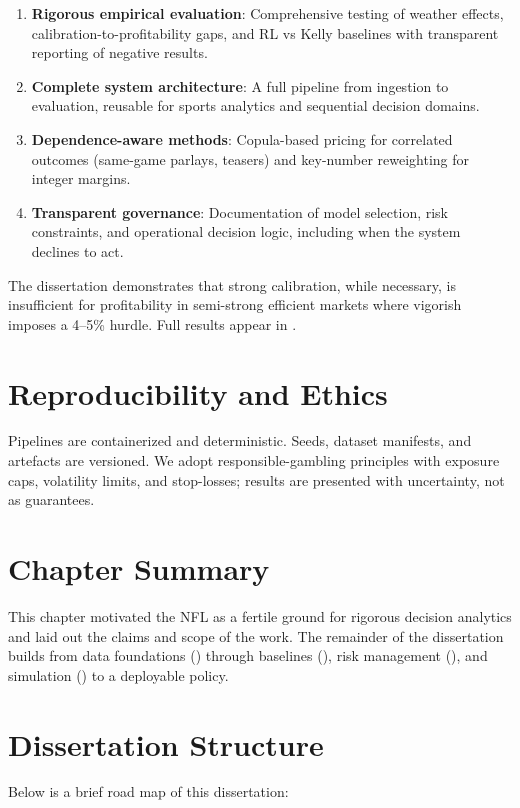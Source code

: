 \begin{enumerate}
  \item \textbf{Rigorous empirical evaluation}: Comprehensive testing of weather effects, calibration-to-profitability gaps, and RL vs Kelly baselines with transparent reporting of negative results.
  \item \textbf{Complete system architecture}: A full pipeline from ingestion to evaluation, reusable for sports analytics and sequential decision domains.
  \item \textbf{Dependence-aware methods}: Copula-based pricing for correlated outcomes (same-game parlays, teasers) and key-number reweighting for integer margins.
  \item \textbf{Transparent governance}: Documentation of model selection, risk constraints, and operational decision logic, including when the system declines to act.
\end{enumerate}

\noindent The dissertation demonstrates that strong calibration, while necessary, is insufficient for profitability in semi-strong efficient markets where vigorish imposes a 4--5\% hurdle. Full results appear in .

\section{Reproducibility and Ethics}
Pipelines are containerized and deterministic. Seeds, dataset manifests, and artefacts are versioned. We adopt responsible-gambling principles with exposure caps, volatility limits, and stop-losses; results are presented with uncertainty, not as guarantees.

\section{Chapter Summary}
This chapter motivated the NFL as a fertile ground for rigorous decision analytics and laid out the claims and scope of the work. The remainder of the dissertation builds from data foundations () through baselines (), risk management (), and simulation () to a deployable policy.

\section{Dissertation Structure}

Below is a brief road map of this dissertation:


